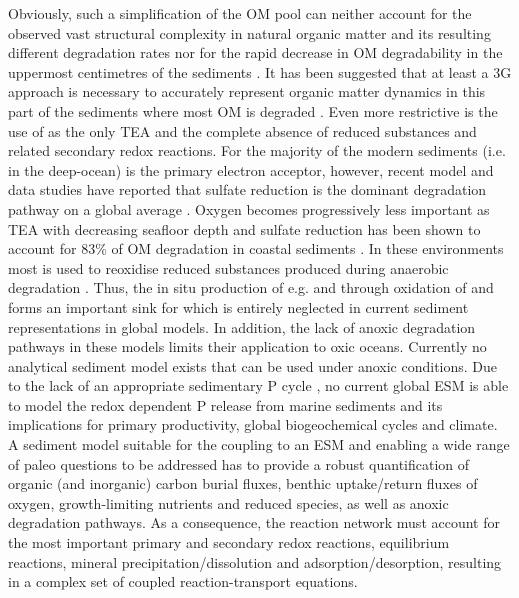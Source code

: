 \documentclass[gmd, manuscript]{copernicus}
\begin{document}
Obviously, such a simplification of the OM pool can neither account for the observed vast structural complexity in natural organic matter and its resulting different degradation 
rates nor for the rapid decrease in OM degradability in the uppermost centimetres of the sediments \citep{arndt_quantifying_2013}. It has been suggested that at least a 3G approach 
is necessary to accurately represent organic matter dynamics in this part of the sediments where most OM is degraded \citep[e.g.][]{soetaert_model_1996}. 
Even more restrictive is the use of  as the only TEA and the complete absence of reduced substances and related secondary redox reactions. 
For the majority of the modern sediments (i.e. in the deep-ocean)  is the primary electron acceptor, %
however, recent model and data studies have reported that sulfate reduction is the dominant degradation pathway on a global average 
\citep[with contributions of 55-76\%][]{canfield_aquatic_2005, jorgensen_sulfur_2006, thullner_global_scale_2009}. 
Oxygen becomes progressively less important as TEA with decreasing seafloor depth and sulfate reduction has been shown to account for 83\% of OM degradation in coastal sediments \citep{krumins_dissolved_2013}. 
In these environments most  is used to reoxidise reduced substances produced during anaerobic degradation \citep{canfield_aquatic_2005, thullner_global_scale_2009}. 
Thus, the in situ production of e.g.  and  through oxidation of  and  forms an important sink for  which is entirely neglected in 
current sediment representations in global models.
In addition, the lack of anoxic degradation pathways in these models limits their application to oxic oceans. Currently no analytical sediment model exists that can be used under anoxic conditions. 
Due to the lack of an appropriate sedimentary P cycle \citep[with the exception of the HAMOCC version of][]{palastanga_long_term_2011}, no current global ESM is able to model 
the redox dependent P release from marine sediments and its implications for primary productivity, global biogeochemical cycles and climate. A sediment model suitable for the coupling to an ESM and enabling a wide range of paleo questions 
to be addressed has to provide a robust quantification of organic (and inorganic) carbon burial fluxes, benthic uptake/return fluxes of oxygen, growth-limiting nutrients and reduced species, as well as anoxic degradation pathways. 
As a consequence, the reaction network must account for the most important primary and secondary redox reactions, equilibrium reactions, mineral precipitation/dissolution and adsorption/desorption, resulting in a complex set of 
coupled reaction-transport equations. 
\end{document}
